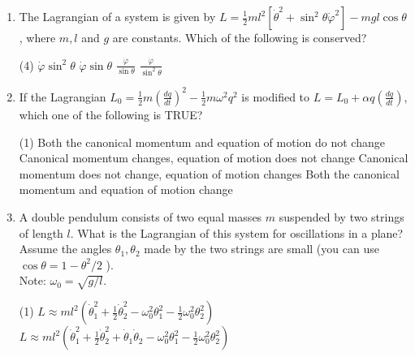 \begin{enumerate}
	{}
	\begin{figure}[H]
		\centering
		\texttt{[image: diagram-20210915(4)-crop]}
	\end{figure}
	\begin{tasks}(4)
		\task[\textbf{A.}] $m \dot{r}$
		\task[\textbf{B.}] $\frac{1}{\sqrt{2}} m \dot{r}$
		\task[\textbf{C.}] $\frac{1}{2} m \dot{r}$
		\task[\textbf{D.}] $\sqrt{2} m \dot{r}$
	\end{tasks}
	\item The Lagrangian of a system is given by
	$L=\frac{1}{2} m l^{2}\left[\dot{\theta}^{2}+\sin ^{2} \theta \dot{\varphi}^{2}\right]-m g l \cos \theta$, where $m, l$ and $g$ are constants.
	Which of the following is conserved?
	{}
	\begin{tasks}(4)
		\task[\textbf{A.}] $\dot{\varphi} \sin ^{2} \theta$
		\task[\textbf{B.}] $\dot{\varphi} \sin \theta$
		\task[\textbf{C.}] $\frac{\dot{\varphi}}{\sin \theta}$
		\task[\textbf{D.}] $\frac{\dot{\varphi}}{\sin ^{2} \theta}$
	\end{tasks}
	\item If the Lagrangian $L_{0}=\frac{1}{2} m\left(\frac{d q}{d t}\right)^{2}-\frac{1}{2} m \omega^{2} q^{2}$ is modified to $L=L_{0}+\alpha q\left(\frac{d q}{d t}\right)$, which one of the following is TRUE?
	{}
	\begin{tasks}(1)
		\task[\textbf{A.}] Both the canonical momentum and equation of motion do not change
		\task[\textbf{B.}] Canonical momentum changes, equation of motion does not change
		\task[\textbf{C.}] Canonical momentum does not change, equation of motion changes
		\task[\textbf{D.}] Both the canonical momentum and equation of motion change
	\end{tasks}
	\item  A double pendulum consists of two equal masses $m$ suspended by two strings of length $l$. What is the Lagrangian of this system for oscillations in a plane? Assume the angles $\theta_{1}, \theta_{2}$ made by the two strings are small (you can use $\cos \theta=1-\theta^{2} / 2$ ).\\
	Note: $\omega_{0}=\sqrt{g / l}$.
	{}
	\begin{tasks}(1)
		\task[\textbf{A.}] $L \approx m l^{2}\left(\dot{\theta}_{1}^{2}+\frac{1}{2} \dot{\theta}_{2}^{2}-\omega_{0}^{2} \theta_{1}^{2}-\frac{1}{2} \omega_{0}^{2} \theta_{2}^{2}\right)$
		\task[\textbf{B.}]  $L \approx m l^{2}\left(\dot{\theta}_{1}^{2}+\frac{1}{2} \dot{\theta}_{2}^{2}+\dot{\theta}_{1} \dot{\theta}_{2}-\omega_{0}^{2} \theta_{1}^{2}-\frac{1}{2} \omega_{0}^{2} \theta_{2}^{2}\right)$

\end{tasks}
\end{enumerate}
